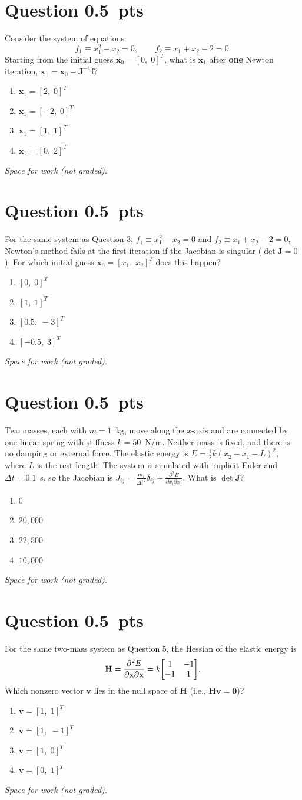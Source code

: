 \documentclass[letterpaper,11pt]{article}
\newcounter{qnum}
\newcommand{\qpts}{0.5}
\newcommand{\mcq}[5]{%
  \clearpage
  \stepcounter{qnum}%
  \section*{Question \theqnum \hfill \normalsize \qpts~pts}
  #1
  \begin{enumerate}[label=(\alph*)]
    \item #2
    \item #3
    \item #4
    \item #5
  \end{enumerate}
  \vspace{3mm}

  \textit{Space for work (not graded).}
}
\begin{document}
%
%
\mcq{Consider the system of equations
\[
f_1 \equiv x_1^2 - x_2 = 0, \qquad f_2 \equiv x_1 + x_2 - 2 = 0.
\]
Starting from the initial guess $\mathbf{x}_0 = [0, \; 0]^T$, what is $\mathbf{x}_1$ after \textbf{one} Newton iteration, $\mathbf{x}_1 = \mathbf{x}_0 - \mathbf{J}^{-1} \mathbf{f}$?}
  {$\mathbf{x}_1 = [2, \; 0]^T$}
  {$\mathbf{x}_1 = [-2, \; 0]^T$}
  {$\mathbf{x}_1 = [1, \; 1]^T$}
  {$\mathbf{x}_1 = [0, \; 2]^T$}

%
%
\mcq{For the same system as Question 3, $f_1 \equiv x_1^2 - x_2 = 0$ and $f_2 \equiv x_1 + x_2 - 2 = 0$, Newton's method fails at the first iteration if the Jacobian is singular ($\det \mathbf{J} = 0$). For which initial guess $\mathbf{x}_0 = [x_1, \; x_2]^T$ does this happen?}
  {$[0, \; 0]^T$}
  {$[1, \; 1]^T$}
  {$[0.5, \; -3]^T$}
  {$[-0.5, \; 3]^T$}

%
%
\mcq{Two masses, each with $m = 1$~kg, move along the $x$-axis and are connected by one linear spring with stiffness $k = 50$~N/m. Neither mass is fixed, and there is no damping or external force. The elastic energy is $E = \frac{1}{2} k (x_2 - x_1 - L)^2$, where $L$ is the rest length. The system is simulated with implicit Euler and $\Delta t = 0.1$~s, so the Jacobian is $J_{ij} = \frac{m_i}{\Delta t^2} \delta_{ij} + \frac{\partial^2 E}{\partial x_i \partial x_j}$. What is $\det \mathbf{J}$?}
  {$0$}
  {$20{,}000$}
  {$22{,}500$}
  {$10{,}000$}

%
%
\mcq{For the same two-mass system as Question 5, the Hessian of the elastic energy is
\[
\mathbf{H} = \frac{\partial^2 E}{\partial \mathbf{x} \partial \mathbf{x}} = k \mqty[1 & -1 \\ -1 & 1].
\]
Which nonzero vector $\mathbf{v}$ lies in the null space of $\mathbf{H}$ (i.e., $\mathbf{H}\mathbf{v} = \mathbf{0}$)?}
  {$\mathbf{v} = [1, \; 1]^T$}
  {$\mathbf{v} = [1, \; -1]^T$}
  {$\mathbf{v} = [1, \; 0]^T$}
  {$\mathbf{v} = [0, \; 1]^T$}
\end{document}
